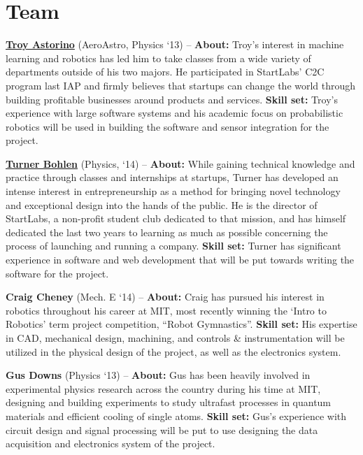 \documentclass[8pt]{article}
\begin{document}
\section*{Team}
\textbf{\href{http://www.troyastorino.com}{Troy Astorino}} (AeroAstro, Physics `13) -- \textbf{About:} Troy's interest in machine learning and robotics has led him to take classes from a wide variety of departments outside of his two majors. He participated in StartLabs' C2C program last IAP and firmly believes that startups can change the world through building profitable businesses around products and services. \textbf{Skill set:} Troy's experience with large software systems and his academic focus on probabilistic robotics will be used in building the software and sensor integration for the project. 

\vspace{.2cm}

\noindent \textbf{\href{http://www.turnerbohlen.com}{Turner Bohlen}} (Physics, `14) -- \textbf{About:} While gaining technical knowledge and practice through classes and internships at startups, Turner has developed an intense interest in entrepreneurship as a method for bringing novel technology and exceptional design into the hands of the public. He is the director of StartLabs, a non-profit student club dedicated to that mission, and has himself dedicated the last two years to learning as much as possible concerning the process of launching and running a company. \textbf{Skill set:} Turner has significant experience in software and web development that will be put towards writing the software for the project.

\vspace{.2cm}

\noindent \textbf{Craig Cheney} (Mech. E `14) -- \textbf{About:} Craig has pursued his interest in robotics throughout his career at MIT, most recently winning the `Intro to Robotics' term project competition, ``Robot Gymnastics''. \textbf{Skill set:} His expertise in CAD, mechanical design, machining, and controls \& instrumentation will be utilized in the physical design of the project, as well as the electronics system.

\vspace{.2cm}

\noindent \textbf{Gus Downs} (Physics `13) -- \textbf{About:} Gus has been heavily involved in experimental physics research across the country during his time at MIT, designing and building experiments to study ultrafast processes in quantum materials and efficient cooling of single atoms. \textbf{Skill set:} Gus's experience with circuit design and signal processing will be put to use designing the data acquisition and electronics system of the project.
\end{document}
